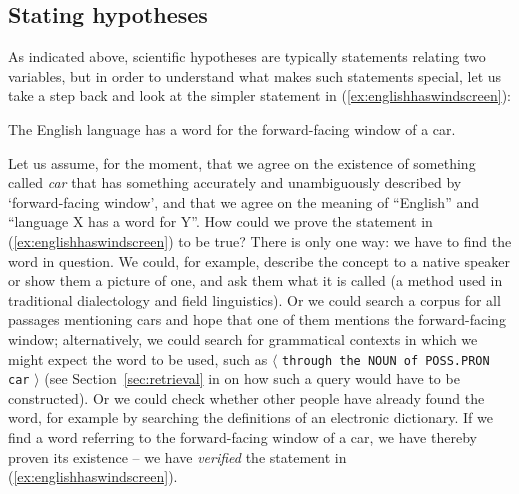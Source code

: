 \subsection{Stating hypotheses}
\label{sec:statinghypotheses}

As indicated above, scientific hypotheses are typically statements relating two variables, but in order to understand what makes such statements special, let us take a step back and look at the simpler statement in (\ref{ex:englishhaswindscreen}):

\begin{exe}
\ex The English language has a word for the forward\hyp{}facing window of a car.
\label{ex:englishhaswindscreen}
\end{exe}

Let us assume, for the moment, that we agree on the existence of something called \textit{car} that has something accurately and unambiguously described by `forward\hyp{}facing window', and that we agree on the meaning  of ``English'' and ``language X has a word for Y''. How could we prove the statement in (\ref{ex:englishhaswindscreen}) to be true? There is only one way: we have to find the word in question. We could, for example, describe the concept  to a native speaker or show them a picture of one, and ask them what it is called (a method used in traditional dialectology and field linguistics). Or we could search a corpus for all passages mentioning cars and hope that one of them mentions the forward\hyp{}facing window; alternatively, we could search for grammatical contexts in which we might expect the word to be used, such as $\langle$ \texttt{through the NOUN of POSS.PRON car} $\rangle$ (see Section~\ref{sec:retrieval} in  on how such a query  would have to be constructed). Or we could check whether other people have already found the word, for example by searching the definitions of an electronic dictionary.  If we find a word referring to the forward\hyp{}facing window of a car, we have thereby proven its existence -- we have \emph{verified} the statement in (\ref{ex:englishhaswindscreen}).

